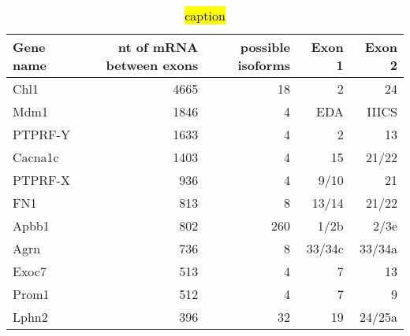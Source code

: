 \begin{table}[h]
\begin{tabular}{|l|r|r|r|r|}
\hline
\textbf{Gene name} & \textbf{nt of mRNA between exons} & \textbf{possible isoforms} & \textbf{Exon 1} & \textbf{Exon 2} \\ \hline
Chl1               & 4665                              & 18                         & 2               & 24              \\ \hline
Mdm1               & 1846                              & 4                          & EDA             & IIICS           \\ \hline
PTPRF-Y            & 1633                              & 4                          & 2               & 13              \\ \hline
Cacna1c            & 1403                              & 4                          & 15              & 21/22           \\ \hline
PTPRF-X            & 936                               & 4                          & 9/10            & 21              \\ \hline
FN1                & 813                               & 8                          & 13/14           & 21/22           \\ \hline
Apbb1              & 802                               & 260                        & 1/2b            & 2/3e            \\ \hline
Agrn               & 736                               & 8                          & 33/34c          & 33/34a          \\ \hline
Exoc7              & 513                               & 4                          & 7               & 13              \\ \hline
Prom1              & 512                               & 4                          & 7               & 9               \\ \hline
Lphn2              & 396                               & 32                         & 19              & 24/25a          \\ \hline
\end{tabular}
  \caption[Genes with big spans in between]{\hl{caption}}
  \label{table: BigSpanGenes}
\end{table}
